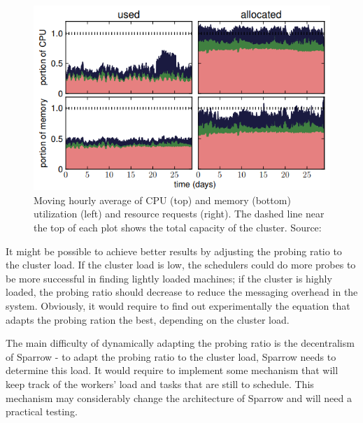 \documentclass[11pt]{article}
\begin{document}
		\begin{figure}
			\centering
			\includegraphics[scale=.5]{google}
			\caption{Moving hourly average of CPU (top) and memory (bottom) utilization (left) and resource requests (right). The dashed line near the top of each plot shows the total capacity of the cluster. Source: \cite{hetero}}
			\label{google}
		\end{figure}
		
		It might be possible to achieve better results by adjusting the probing ratio to the cluster load. If the cluster load is low, the schedulers could do more probes to be more successful in finding lightly loaded machines; if the cluster is highly loaded, the probing ratio should decrease to reduce the messaging overhead in the system. Obviously, it would require to find out experimentally the equation that adapts the probing ration the best, depending on the cluster load.
		
		The main difficulty of dynamically adapting the probing ratio is the decentralism of Sparrow - to adapt the probing ratio to the cluster load, Sparrow needs to determine this load. It would require to implement some mechanism that will keep track of the workers' load and tasks that are still to schedule. This mechanism may considerably change the architecture of Sparrow and will need a practical testing.
		
\end{document}
